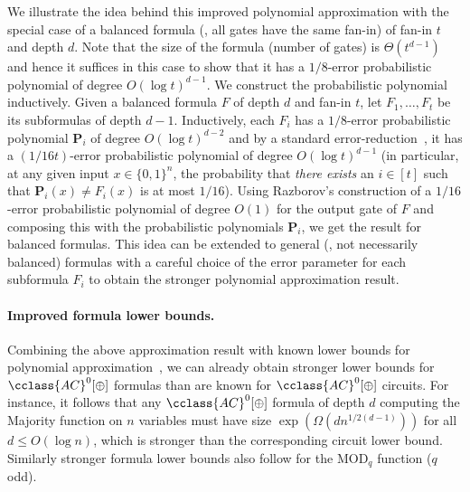 \documentclass{toc}
\newcommand{\mb}{\mathbf}
\newcommand{\AC}{\cclass{AC}}
\begin{document}
We illustrate the idea behind this improved polynomial approximation with the special case of a balanced formula (\ie, all gates have the same fan-in) of fan-in $t$ and depth $d$. Note that the size of the formula (number of gates) is $\Theta(t^{d-1})$ and hence it suffices in this case to show that it has a $1/8$-error probabilistic polynomial of degree $O(\log t)^{d-1}$. We construct the probabilistic polynomial inductively. Given a balanced formula $F$ of depth $d$ and fan-in $t$, let $F_1,\ldots,F_t$ be its subformulas of depth $d-1$. Inductively, each $F_i$ has a $1/8$-error probabilistic polynomial ${\mb P}_i$ of degree $O(\log t)^{d-2}$ and by a standard error-reduction~\cite{kopparty2012certifying}, it has a $(1/16t)$-error probabilistic polynomial of degree $O(\log t)^{d-1}$ (in particular, at any given input $x\in \{0,1\}^n$, the probability that \emph{there exists} an $i\in [t]$ such that ${\mb P}_i(x)\neq F_i(x)$ is at most $1/16$). Using Razborov's construction of a $1/16$-error probabilistic polynomial of degree $O(1)$ for the output gate of $F$ and composing this with the probabilistic polynomials ${\mb P}_i$, we get the result for balanced formulas. This idea can be extended to general (\ie, not necessarily balanced) formulas with a careful choice of the error parameter for each subformula $F_i$ to obtain the stronger polynomial approximation result. 

\paragraph{Improved formula lower bounds.} Combining the above approximation result with known lower bounds for polynomial 
approximation~\cite{Razborov,Smolensky87,Szegedy1989, %
Smolensky93}, we can already obtain stronger lower bounds for $\AC^0[\oplus]$ formulas than are known for $\AC^0[\oplus]$ circuits. For instance, it follows that any $\AC^0[\oplus]$ formula of depth $d$ computing the Majority function on $n$ variables must have size $\exp(\Omega(dn^{1/2(d-1)}))$ for all $d \le O(\log n)$, which is stronger than the corresponding circuit lower bound. Similarly stronger formula lower bounds also follow for the $\mathrm{MOD}_q$ function ($q$ odd). 
\end{document}
